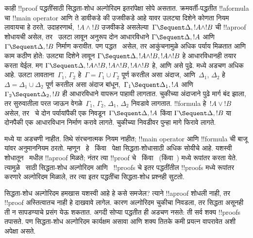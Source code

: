 \documentclass[../../../include/open-logic-section]{subfiles}
\begin{document}
काही !!{proof} पद्धतींसाठी सिद्धता-शोध
अल्गोरिदम इतरांपेक्षा सोपे असतात. क्रमवर्ती-पद्धतीत
!!a{formula} चा !!{main operator} आणि ते डावीकडे
की उजवीकडे आहे यावर उलट्या दिशेने कोणता नियम
लावायचा हे ठरते. उदाहरणार्थ,~$!A \land !B$
उजवीकडे असलेल्या~$\Gamma \Sequent \Delta, !A \land !B$
ची !!a{proof} शोधायची असेल, तर~\RightR{\land}
उलटा लावून अनुरूप दोन आधारविधाने
$\Gamma \Sequent \Delta, !A$ आणि
$\Gamma \Sequent \Delta, !B$ निर्माण करावीत.
पण पद्धत~ असेल, तर आकुंचनामुळे अधिक
पर्याय मिळतात आणि काम कठीण होते: उलट्या दिशेने
\RightR{\Contraction} लावून
$\Gamma \Sequent \Delta, !A \land !B, !A \land !B$
हे आधारविधानही तयार करता येईल. मग
$\Gamma \Sequent \Delta, !A \land !B, !A \land !B, !A \land !B$
हे, आणि असे पुढे.  मध्ये अडचण अधिक आहे.
\RightR{\land} उलटा लावताना~$\Gamma_1$, $\Gamma_2$
हे~$\Gamma = \Gamma_1 \cup \Gamma_2$ पूर्ण करतील
असा अंदाज, आणि~$\Delta_1$, $\Delta_2$ हे
$\Delta = \Delta_1 \cup \Delta_2$ पूर्ण करतील
असा अंदाज बांधून,~$\Gamma_1 \Sequent \Delta_1, !A$
आणि~$\Gamma_2 \Sequent \Delta_2, !B$ ही
आधारविधाने वापरून पाहावी लागतात. चुकीच्या अंदाजाने
पुढे मार्ग बंद झाला, तर सुरुवातीला परत जाऊन
वेगळे~$\Gamma_1$, $\Gamma_2$, $\Delta_1$, $\Delta_2$
निवडावे लागतात. !!{formula} हे~$!A \lor !B$
असेल, तर~\RightR{\lor} चे दोन पर्यायांपैकी एक
निवडून~$\Gamma \Sequent \Delta, !A$ किंवा
$\Gamma \Sequent \Delta, !B$ या दोनपैकी
एक आधारविधान निर्माण करावे लागते. चुकीच्या
निवडीवर पुन्हा मागे फिरावे लागते.

 मध्ये या अडचणी नाहीत.
तिथे संरचनात्मक नियम नाहीत; !!{main operator}
आणि !!{formula} ची बाजू यांवर अनुमाननियम ठरतो.
म्हणून~ हे~ किंवा~
पेक्षा सिद्धता-शोधासाठी अधिक सोयीचे आहे.
यशस्वी शोधातून~ मधील !!a{proof} मिळते;
नंतर त्या !!{proof} चे~ किंवा~
(किंवा~) मध्ये रूपांतर करता येते.
त्यामुळे~ साठी सिद्धता-शोध अल्गोरिदम
आणि~ !!{proof}s चे इतर पद्धतींतील
!!{proof}s मध्ये रूपांतर करणारे अल्गोरिदम मिळाले,
तर त्या इतर पद्धतींचा सिद्धता-शोध प्रश्नही सुटतो.

सिद्धता-शोध अल्गोरिदम हमखास यशस्वी आहे
हे कसे समजेल? त्याने !!a{proof} शोधली नाही,
तर !!{proof} अस्तित्वातच नाही हे दाखवावे लागेल.
कारण अल्गोरिदम चुकीचा निवडला, तर सिद्धता
असूनही ती न सापडण्याचे प्रसंग येऊ शकतात.
अगदी सोप्या पद्धतीत ही अडचण नसते: ती सर्व
शक्य !!{proof}s तपासते. पण सिद्धता-शोध
अल्गोरिदम कार्यक्षम असावा आणि शक्य तितके कमी
प्रयत्न वापरावेत अशी अपेक्षा असते.
\end{document}
